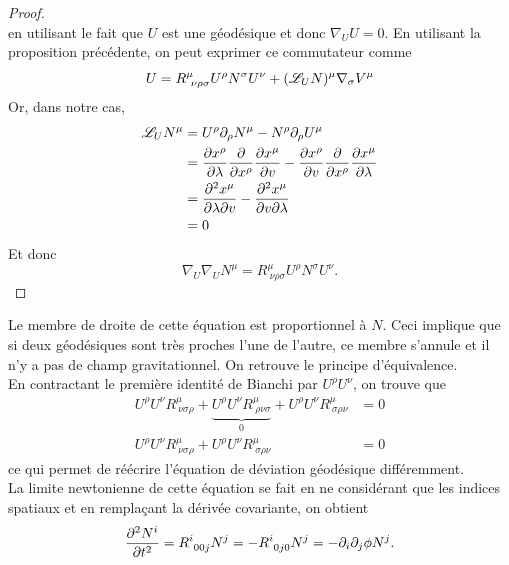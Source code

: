 \documentclass[a4paper,11pt]{report}
\begin{document}
\begin{proof}
\begin{equation}
                \end{equation}
                en utilisant le fait que $U$ est une géodésique et donc $\nabla_U U = 0$. En utilisant la proposition précédente, on peut exprimer ce commutateur comme
                \begin{equation}
                    [\nabla_U,\nabla_N]U = R^\mu_{~\nu\rho\sigma}U^\rho N^\sigma U^\nu + (\L_U N)^\mu \nabla_\sigma V^\mu
                \end{equation}
                Or, dans notre cas,
                \begin{align}
                    \mathscr{L}_U N^\mu &= U^\rho\partial_\rho N^\mu-N^\rho\partial_\rho U^\mu\\
                    &= \pdv{x^\rho}{\lambda}\pdv{}{x^\rho}\pdv{x^\mu}{v}-\pdv{x^\rho}{v}\pdv{}{x^\rho}\pdv{x^\mu}{\lambda}\\
                    &= \pdv{x^\mu}{\lambda}{v}-\pdv{x^\mu}{v}{\lambda}\\
                    &= 0
                \end{align}
                Et donc
                \begin{equation}
                    \nabla_U\nabla_U N^\mu = R^\mu_{~\nu\rho\sigma}U^\rho N^\sigma U^\nu.
                \end{equation}
            \end{proof}
            Le membre de droite de cette équation est proportionnel à $N$. Ceci implique que si deux géodésiques sont très proches l'une de l'autre, ce membre s'annule et il n'y a pas de champ gravitationnel. On retrouve le principe d'équivalence.\\
        
            En contractant le première identité de Bianchi par $U^\rho U^\nu$, on trouve que 
            \begin{align}
                U^\rho U^\nu R^\mu_{~\nu\sigma\rho}+\underbrace{U^\rho U^\nu R^\mu_{~\rho\nu\sigma}}_{0}+U^\rho U^\nu R^\mu_{~\sigma\rho\nu} &= 0\\
                U^\rho U^\nu R^\mu_{~\nu\sigma\rho}+U^\rho U^\nu R^\mu_{~\sigma\rho\nu} &= 0
            \end{align}
            ce qui permet de réécrire l'équation de déviation géodésique différemment.\\
            
            La limite newtonienne de cette équation se fait en ne considérant que les indices spatiaux et en remplaçant la dérivée covariante, on obtient
            \begin{equation}
                \pdv[2]{N^i}{t} = R^i_{~00j}N^j = -R^i_{~0j0}N^j = -\partial_i\partial_j\phi N^j.
            \end{equation}
        
\end{document}
